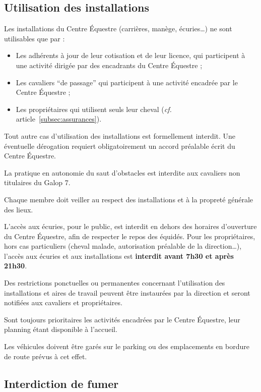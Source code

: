 \documentclass[11pt,a4paper]{article}
\begin{document}
   \subsection{Utilisation des installations}\label{subsec:utilisation-des-installations}
   Les installations du Centre Équestre (carrières, manège, écuries\dots) ne sont utilisables que par :
   \begin{itemize}
      \item
      Les adhérents à jour de leur cotisation et de leur licence, qui participent à une activité dirigée par des encadrants du Centre Équestre ;
      \item
      Les cavaliers \enquote{de passage} qui participent à une activité encadrée par le Centre Équestre ;
      \item
      Les propriétaires qui utilisent seuls leur cheval (\textit{cf.} article~\ref{subsec:assurances}).
   \end{itemize}

   Tout autre cas d'utilisation des installations est formellement interdit.
   Une éventuelle dérogation requiert obligatoirement un accord préalable écrit du Centre Équestre.

   La pratique en autonomie du saut d'obstacles est interdite aux cavaliers non titulaires du Galop 7.

   Chaque membre doit veiller au respect des installations et à la propreté générale des lieux.

   L'accès aux écuries, pour le public, est interdit en dehors des horaires d'ouverture du Centre Équestre, afin de respecter le repos des équidés.
   Pour les propriétaires, hors cas particuliers (cheval malade, autorisation préalable de la direction\dots), l'accès aux écuries et aux installations est \textbf{interdit avant 7h30 et après 21h30}.

   Des restrictions ponctuelles ou permanentes concernant l'utilisation des installations et aires de travail peuvent être instaurées par la direction et seront notifiées aux cavaliers et propriétaires.

   Sont toujours prioritaires les activités encadrées par le Centre Équestre, leur planning étant disponible à l'accueil.

   Les véhicules doivent être garés sur le parking ou des emplacements en bordure de route prévus à cet effet.

   \subsection{Interdiction de fumer}\label{subsec:interdiction-de-fumer}
\end{document}
